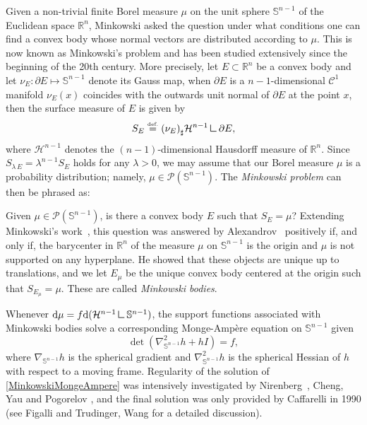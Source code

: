 \documentclass[a4paper, 10pt, twoside]{amsart}
\numberwithin{equation}{section}
\theoremstyle{plain}
\theoremstyle{definition}
\newenvironment{block}%
  {\list{}{\leftmargin=.5in\rightmargin=.5in}  \item[]  }%
  {\endlist}
\begin{document}
Given a non-trivial finite Borel measure $\mu$ on the unit sphere $\mathbb{S}^{n-1}$ of the Euclidean space $\mathbb{R}^n$, Minkowski asked the question under what conditions  one can  find a convex body whose normal vectors are distributed according to $\mu$. This is now known as Minkowski's problem and has been studied extensively since the beginning of the 20th century. More precisely, let $E \subset \mathbb{R}^n$ be a convex body and let $\nu_E : \partial E \mapsto \mathbb{S}^{n-1}$ denote its Gauss map, when $\partial E$ is a $n-1$-dimensional $\mathscr{C}^1$ manifold $\nu_E(x)$ coincides with the outwards unit normal of $\partial E$ at the point $x$, then the surface measure of $E$ is given by 
\begin{equation}\label{eq.surface_measure_def}
    S_E \eqdef {(\nu_E)}_\sharp \mathcal{H}^{n-1}\mres \partial E, 
\end{equation}
where $\mathcal{H}^{n-1}$ denotes the $(n-1)$-dimensional Hausdorff measure of $\mathbb{R}^n$. Since $S_{\lambda\,E}=\lambda^{n-1}S_E$ holds for any $\lambda>0$, we may assume that our Borel measure $\mu$ is a probability distribution; namely, $\mu \in \mathscr{P}(\mathbb{S}^{n-1})$.
The \textit{Minkowski problem} can then be phrased as:
\begin{block}
    Given $\mu \in \mathscr{P}(\mathbb{S}^{n-1})$, is there a convex body $E$ such that $S_E = \mu $? 
\end{block}
Extending Minkowski's work~\cite{minkowski1903volumen,minkowski1911theorie}, this question was answered by Alexandrov~\cite{aleksandrov1938theory,aleksandrov1996ad} positively if, and only if, the barycenter in $\mathbb{R}^n$ of the measure $\mu$ on $\mathbb{S}^{n-1}$ is the origin and $\mu$ is not supported on any hyperplane. He showed that these objects are unique up to translations, and we let $E_\mu$ be the unique convex body centered at the origin such that $S_{E_\mu} = \mu$. These are called \textit{Minkowski bodies}.

Whenever $\dd\mu=f\dd(\mathcal{H}^{n-1}\mres \mathbb{S}^{n-1})$, the support functions associated with Minkowski bodies solve a corresponding Monge-Amp\`ere equation on $\mathbb{S}^{n-1}$ given
\begin{equation}
\label{MinkowskiMongeAmpere}
    \det(\nabla_{\mathbb{S}^{n-1}}^2 h+h I)=f, 
\end{equation}
where $\nabla_{\mathbb{S}^{n-1}} h$ is the spherical gradient and
$\nabla_{\mathbb{S}^{n-1}}^2 h$ is the spherical Hessian of $h$ with respect to a moving frame. Regularity of the solution of \eqref{MinkowskiMongeAmpere} was intensively investigated by 
Nirenberg~\cite{nirenberg1953weyl}, Cheng, Yau \cite{cheng1976regularity} and Pogorelov \cite{pogorelov1964monge}, and the final solution was only provided by Caffarelli \cite{caffarelli1990interior,caffarelli1990localization} in 1990   (see Figalli \cite{figalli2017monge} and Trudinger, Wang \cite{trudinger2008monge} for a detailed discussion).
\end{document}
